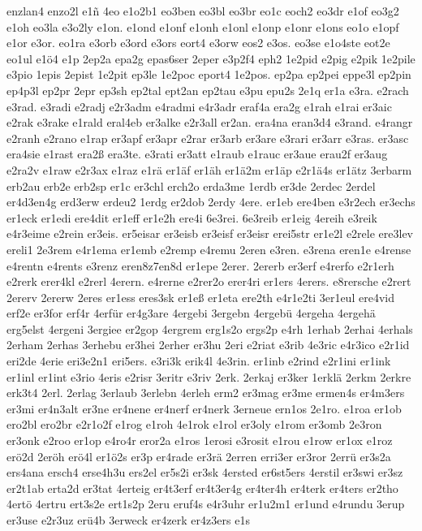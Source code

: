 {enzlan4
enzo2l
e1ñ
4eo
e1o2b1
eo3ben
eo3bl
eo3br
eo1c
eoch2
eo3dr
e1of
eo3g2
e1oh
eo3la
e3o2ly
e1on.
e1ond
e1onf
e1onh
e1onl
e1onp
e1onr
e1ons
eo1o
e1opf
e1or
e3or.
eo1ra
e3orb
e3ord
e3ors
eort4
e3orw
eos2
e3os.
eo3se
e1o4ste
eot2e
eo1ul
e1ö4
e1p
2ep2a
epa2g
epas6ser
2eper
e3p2f4
eph2
1e2pid
e2pig
e2pik
1e2pile
e3pio
1epis
2epist
1e2pit
ep3le
1e2poc
eport4
1e2pos.
ep2pa
ep2pei
eppe3l
ep2pin
ep4p3l
ep2pr
2epr
ep3sh
ep2tal
ept2an
ep2tau
e3pu
epu2s
2e1q
er1a
e3ra.
e2rach
e3rad.
e3radi
e2radj
e2r3adm
e4radmi
e4r3adr
eraf4a
era2g
e1rah
e1rai
er3aic
e2rak
e3rake
e1rald
eral4eb
er3alke
e2r3all
er2an.
era4na
eran3d4
e3rand.
e4rangr
e2ranh
e2rano
e1rap
er3apf
er3apr
e2rar
er3arb
er3are
e3rari
er3arr
e3ras.
er3asc
era4sie
e1rast
era2ß
era3te.
e3rati
er3att
e1raub
e1rauc
er3aue
erau2f
er3aug
e2ra2v
e1raw
e2r3ax
e1raz
e1rä
er1äf
er1äh
er1ä2m
er1äp
e2r1ä4s
er1ätz
3erbarm
erb2au
erb2e
erb2sp
er1c
er3chl
erch2o
erda3me
1erdb
er3de
2erdec
2erdel
er4d3en4g
erd3erw
erdeu2
1erdg
er2dob
2erdy
4ere.
er1eb
ere4ben
e3r2ech
er3echs
er1eck
er1edi
ere4dit
er1eff
er1e2h
ere4i
6e3rei.
6e3reib
er1eig
4ereih
e3reik
e4r3eime
e2rein
er3eis.
er5eisar
er3eisb
er3eisf
er3eisr
erei5str
er1e2l
e2rele
ere3lev
ereli1
2e3rem
e4r1ema
er1emb
e2remp
e4remu
2eren
e3ren.
e3rena
eren1e
e4rense
e4rentn
e4rents
e3renz
eren8z7en8d
er1epe
2erer.
2ererb
er3erf
e4rerfo
e2r1erh
e2rerk
erer4kl
e2rerl
4erern.
e4rerne
e2rer2o
erer4ri
er1ers
4erers.
e8rersche
e2rert
2ererv
2ererw
2eres
er1ess
eres3sk
er1eß
er1eta
ere2th
e4r1e2ti
3er1eul
ere4vid
erf2e
er3for
erf4r
4erfür
er4g3are
4ergebi
3ergebn
4ergebü
4ergeha
4ergehä
erg5elst
4ergeni
3ergiee
er2gop
4ergrem
erg1s2o
ergs2p
e4rh
1erhab
2erhai
4erhals
2erham
2erhas
3erhebu
er3hei
2erher
er3hu
2eri
e2riat
e3rib
4e3ric
e4r3ico
e2r1id
eri2de
4erie
eri3e2n1
eri5ers.
e3ri3k
erik4l
4e3rin.
er1inb
e2rind
e2r1ini
er1ink
er1inl
er1int
e3rio
4eris
e2risr
3eritr
e3riv
2erk.
2erkaj
er3ker
1erklä
2erkm
2erkre
erk3t4
2erl.
2erlag
3erlaub
3erlebn
4erleh
erm2
er3mag
er3me
ermen4s
er4m3ers
er3mi
er4n3alt
er3ne
er4nene
er4nerf
er4nerk
3erneue
ern1os
2e1ro.
e1roa
er1ob
ero2bl
ero2br
e2r1o2f
e1rog
e1roh
4e1rok
e1rol
er3oly
e1rom
er3omb
2e3ron
er3onk
e2roo
er1op
e4ro4r
eror2a
e1ros
1erosi
e3rosit
e1rou
e1row
er1ox
e1roz
erö2d
2eröh
erö4l
er1ö2s
er3p
er4rade
er3rä
2erren
erri3er
er3ror
2errü
er3s2a
ers4ana
ersch4
erse4h3u
ers2el
er5s2i
er3sk
4ersted
er6st5ers
4erstil
er3swi
er3sz
er2t1ab
erta2d
er3tat
4erteig
er4t3erf
er4t3er4g
er4ter4h
er4terk
er4ters
er2tho
4ertö
4ertru
ert3s2e
ert1s2p
2eru
eruf4s
e4r3uhr
er1u2m1
er1und
e4rundu
3erup
er3use
e2r3uz
erü4b
3erweck
er4zerk
er4z3ers
e1s
}
